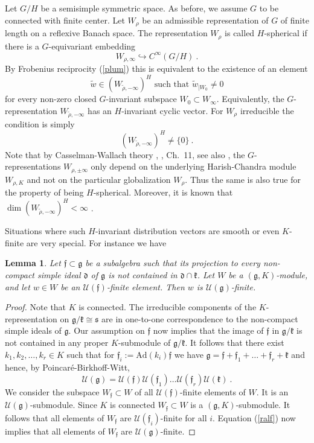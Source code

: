 \documentclass[10]{amsart}
\newtheorem{lem}[thm]{Lemma}
\theoremstyle{remark}
\theoremstyle{definition}
\numberwithin{equation}{section}
\newcommand{\Ad}{\text{Ad}}
\newcommand{\fg}{{\mathfrak g}}
\newcommand{\fd}{{\mathfrak d}}
\newcommand{\ff}{{\mathfrak f}}
\newcommand{\fk}{{\mathfrak k}}
\newcommand{\fs}{{\mathfrak s}}
\newcommand{\Cal}{\mathcal}
\newcommand{\be}{\begin{equation}}
\begin{document}
{Let $G/H$ be a semisimple symmetric space. As before, we assume $G$ to be connected with finite center. Let $W_\rho$ be an admissible representation of $G$ of finite length on a reflexive Banach space. The representation $W_\rho$ is called
$H$-spherical if there is a $G$-equivariant embedding
$$ W_{\rho,\infty}\hookrightarrow C^{\infty}(G/H)\ .$$
By Frobenius reciprocity (\ref{plum}) this is equivalent to the existence of an element
$$ \tilde w \in ( W_{\tilde\rho,-\infty})^H\mbox{ such that  }\tilde w_{|W_0}\ne 0 $$
for every non-zero closed $G$-invariant subspace $W_0\subset W_\infty$. Equivalently, the $G$-representation $W_{\tilde\rho,-\infty}$ has an $H$-invariant cyclic vector. For $W_\rho$ irreducible the condition is simply $$ (W_{\tilde\rho,-\infty})^H\ne\{0\}\ .$$
Note that by Casselman-Wallach theory \cite{Cas89b}, \cite{Wa92}, Ch.~11, see also \cite{BK14}, the $G$-representations $W_{\rho,\pm\infty}$ only depend on the underlying Harish-Chandra module $W_{\rho,K}$ and not
on the particular globalization $W_\rho$. Thus the same is also true for the property of being $H$-spherical. Moreover, it is known that $\dim (W_{\tilde\rho,-\infty})^H<\infty$ \cite{Ban87}.

Situations where such $H$-invariant distribution vectors are smooth or even $K$-finite are very special. For instance we have

\begin{lem}\label{almosttrivial}
Let $\ff\subset \fg$ be a 
subalgebra such that its projection to every non-compact simple ideal $\fd$ of $\fg$ is not contained in $\fd\cap \fk$. Let $W$ be a $(\fg,K)$-module, and let $w\in W$ be an
${\Cal U}(\ff)$-finite element. Then $w$ is ${\Cal U}(\fg)$-finite.
\end{lem}
\begin{proof}
Note that $K$ is connected. The irreducible components of the $K$-representation on $\fg/\fk\cong\fs$
are in one-to-one correspondence to the non-compact simple ideals of $\fg$. Our assumption on $\ff$ now implies that the image of $\ff$ in $\fg/\fk$ is not contained
in any proper $K$-submodule of $\fg/\fk$. It follows that there exist $k_1, k_2,\dots, k_r\in K$ such that for $\ff_i:= \Ad(k_i)\ff$ we have 
$\fg=\ff+\ff_1+\dots+\ff_r+\fk$ and hence, by Poincar\' e-Birkhoff-Witt,
\be\label{ralf} {\Cal U}(\fg)={\Cal U}(\ff){\Cal U}(\ff_1)\dots{\Cal U}(\ff_r){\Cal U}(\fk)\ .\end{equation}
We consider the subspace $W_\ff\subset W$ of all ${\Cal U}(\ff)$-finite elements of $W$.  It is an ${\Cal U}(\fg)$-submodule. Since $K$ is connected  $W_\ff\subset W$  is  a $(\fg,K)$-submodule. It follows
that all elements of $W_\ff$  are ${\Cal U}(\ff_i)$-finite for all $i$. Equation (\ref{ralf}) now implies that all elements of $W_\ff$ are ${\Cal U}(\fg)$-finite.
\end{proof}

}
\end{document}
